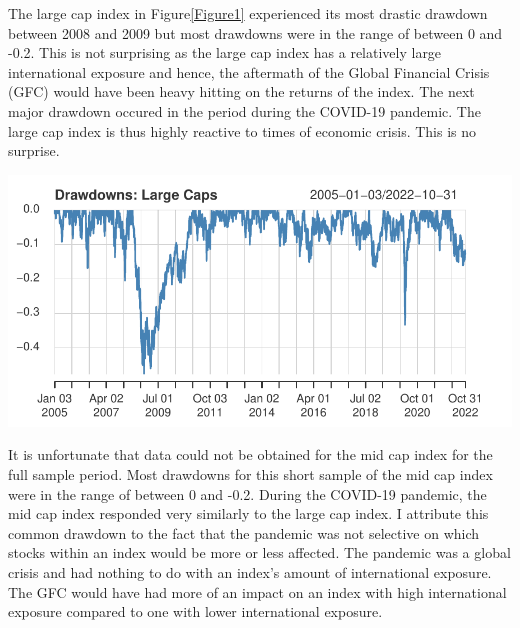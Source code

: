 \documentclass[11pt,preprint, authoryear]{elsarticle}
\let\origfigure\figure
\let\endorigfigure\endfigure
\renewenvironment{figure}[1][2] {
    \expandafter\origfigure\expandafter[H]
} {
    \endorigfigure
}
\numberwithin{equation}{section}
\numberwithin{figure}{section}
\numberwithin{table}{section}
\begin{document}
The large cap index in Figure\ref{Figure1} experienced its most drastic
drawdown between 2008 and 2009 but most drawdowns were in the range of
between 0 and -0.2. This is not surprising as the large cap index has a
relatively large international exposure and hence, the aftermath of the
Global Financial Crisis (GFC) would have been heavy hitting on the
returns of the index. The next major drawdown occured in the period
during the COVID-19 pandemic. The large cap index is thus highly
reactive to times of economic crisis. This is no surprise.

\begin{figure}[H]

{\centering \includegraphics{Volatility-of-Shares_files/figure-latex/Figure1-1} 

}

\caption{Large Cap drawdown chart \label{Figure1}}\label{fig:Figure1}
\end{figure}

It is unfortunate that data could not be obtained for the mid cap index
for the full sample period. Most drawdowns for this short sample of the
mid cap index were in the range of between 0 and -0.2. During the
COVID-19 pandemic, the mid cap index responded very similarly to the
large cap index. I attribute this common drawdown to the fact that the
pandemic was not selective on which stocks within an index would be more
or less affected. The pandemic was a global crisis and had nothing to do
with an index's amount of international exposure. The GFC would have had
more of an impact on an index with high international exposure compared
to one with lower international exposure.
\end{document}
